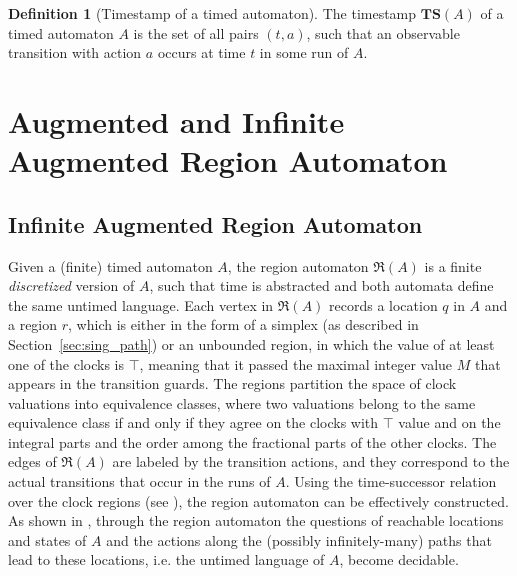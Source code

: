 \documentclass[11pt]{amsart}
\theoremstyle{definition}
\newtheorem{definition}[theorem]{Definition}
\newcommand{\RRR}{\mathfrak{R}}
\newcommand{\TTTSSS}{\mathbf{TS}}
\begin{document}
\begin{definition}[Timestamp of a timed automaton]
	The timestamp $\TTTSSS(A)$ of a timed automaton $A$ is the set of all pairs $(t,a)$, such that an observable transition with action $a$ occurs at time $t$ in some run of $A$.
\end{definition}
\section{Augmented and Infinite Augmented Region Automaton}
\label{sec:IARA}
\subsection{Infinite Augmented Region Automaton}
Given a (finite) timed automaton $A$, the region automaton $\RRR(A)$ \cite{ta} is a finite \emph{discretized} version of $A$, such that time is abstracted and both automata define the same untimed language.
Each vertex in $\RRR(A)$ records a location $q$ in $A$ and a region $r$, which is either in the form of a simplex (as described in Section~\ref{sec:sing_path}) or an unbounded region, in which the value of at least one of the clocks is $\top$, meaning that it passed the maximal integer value $M$ that appears in the transition guards.
The regions partition the space of clock valuations into equivalence classes, where two valuations belong to the same equivalence class if and only if they agree on the clocks with $\top$ value and on the integral parts and the order among the fractional parts of the other clocks.
The edges of $\RRR(A)$ are labeled by the transition actions, and they correspond to the actual transitions that occur in the runs of $A$.
Using the time-successor relation over the clock regions (see \cite{ta}), the region automaton can be effectively constructed.
As shown in \cite{ta}, through the region automaton the questions of reachable locations and states of $A$ and the actions along the (possibly infinitely-many) paths that lead to these locations, i.e. the untimed language of $A$, become decidable.
\end{document}
